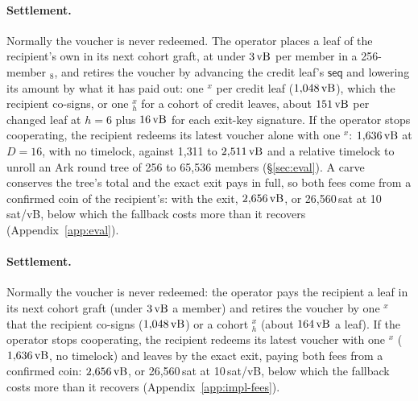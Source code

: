 \iffullversion
\paragraph{Settlement.} Normally the voucher is never redeemed. The
operator places a leaf of the recipient's own in its next cohort graft,
at under $3\,\mathrm{vB}$ per member in a 256-member $_8$, and retires the
voucher by advancing the credit leaf's $\mathsf{seq}$ and lowering its
amount by what it has paid out: one $^{x}$ per credit leaf
($1{,}048\,\mathrm{vB}$), which the recipient co-signs, or one
$_h^{x}$ for a cohort of credit leaves, about $151\,\mathrm{vB}$ per
changed leaf at $h = 6$ plus $16\,\mathrm{vB}$ for each exit-key signature. If the
operator stops cooperating, the recipient redeems its latest voucher
alone with one $^{x}$: $1{,}636\,\mathrm{vB}$ at $D = 16$, with no
timelock, against 1{,}311 to $2{,}511\,\mathrm{vB}$ and a relative timelock to
unroll an Ark round tree of 256 to 65{,}536 members (\S\ref{sec:eval}).
A carve conserves the tree's total and the exact exit pays in full, so
both fees come from a confirmed coin of the recipient's: with the exit,
$2{,}656\,\mathrm{vB}$, or 26{,}560\,sat at 10\,sat/vB, below which the fallback
costs more than it recovers (Appendix~\ref{app:eval}).
\else
\paragraph{Settlement.} Normally the voucher is never redeemed: the
operator pays the recipient a leaf in its next cohort graft (under $3\,\mathrm{vB}$ a
member) and retires the voucher by one $^{x}$ that the recipient
co-signs ($1{,}048\,\mathrm{vB}$) or a cohort $_h^{x}$ (about $164\,\mathrm{vB}$ a
leaf). If the operator stops cooperating, the recipient redeems its latest
voucher with one $^{x}$ ($1{,}636\,\mathrm{vB}$, no timelock) and leaves by
the exact exit, paying both fees from a confirmed coin: $2{,}656\,\mathrm{vB}$, or
26,560\,sat at 10\,sat/vB, below which the fallback costs more than it
recovers (Appendix~\ref{app:impl-fees}).
\fi
